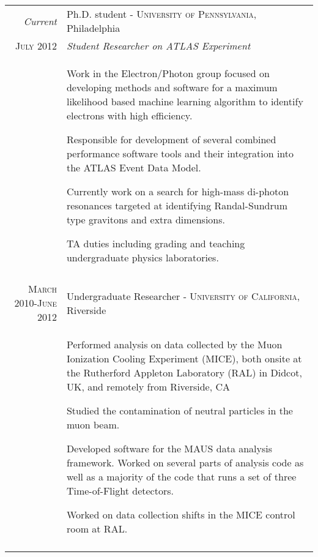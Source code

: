 \documentclass[a4paper,10pt]{article} %
\begin{document}
\begin{longtable}{r|p{11cm}}
\emph{Current}    & Ph.D. student - \textsc{University of Pennsylvania}, Philadelphia \\
\textsc{July 2012} & \emph{Student Researcher on ATLAS Experiment}\\
				   & \begin{itemize}
					 \footnotesize{
						\item Work in the Electron/Photon group focused on developing methods and software for a maximum likelihood based machine learning algorithm to identify electrons with high efficiency.
						\item Responsible for development of several combined performance software tools and their integration into the ATLAS Event Data Model.
						\item Currently work on a search for high-mass di-photon resonances targeted at identifying Randal-Sundrum type gravitons and extra dimensions.
						\item TA duties including grading and teaching undergraduate physics laboratories.
					 }
					 \end{itemize} \\
\multicolumn{2}{c}{} \\


\textsc{March 2010-June 2012} & Undergraduate Researcher - \textsc{University of California}, Riverside \emph{}\\
				  & \begin{itemize}
					\footnotesize{
						\item Performed analysis on data collected by the Muon Ionization Cooling Experiment (MICE), both onsite at the Rutherford Appleton Laboratory (RAL) in Didcot, UK, and remotely from Riverside, CA
						\item Studied the contamination of neutral particles in the muon beam.
					    \item Developed software for the MAUS data analysis framework.  Worked on several parts of analysis code as well as a majority of the code that runs a set of three Time-of-Flight detectors.
						\item Worked on data collection shifts in the MICE control room at RAL.
					}
			        \end{itemize} \\
\multicolumn{2}{c}{} \\


\end{longtable}
\end{document}
